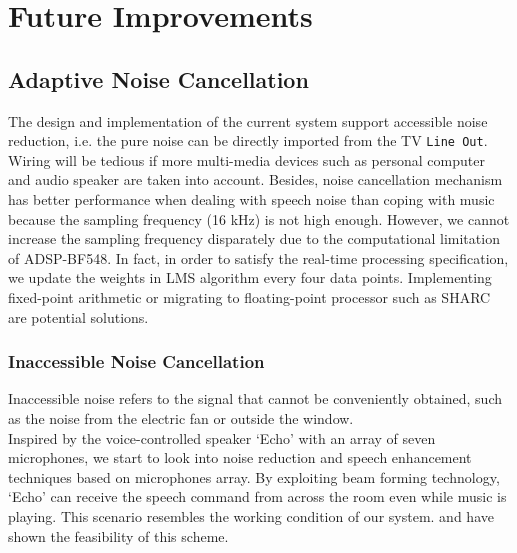 
\section{Future Improvements}

\subsection{Adaptive Noise Cancellation}

The design and implementation of the current system support accessible noise reduction, i.e. the pure noise can be directly imported from the TV \texttt{Line Out}. Wiring will be tedious if more multi-media devices such as personal computer and audio speaker are taken into account. Besides, noise cancellation mechanism has better performance when dealing with speech noise than coping with music because the sampling frequency (16 kHz) is not high enough. However, we cannot increase the sampling frequency disparately due to the computational limitation of ADSP-BF548. In fact, in order to satisfy the real-time processing specification, we update the weights in LMS algorithm every four data points. Implementing fixed-point arithmetic or migrating to floating-point processor such as SHARC\textsuperscript{\textregistered} are potential solutions.


\subsubsection{Inaccessible Noise Cancellation}

Inaccessible noise refers to the signal that cannot be conveniently obtained, such as the noise from the electric fan or outside the window.\\

Inspired by the voice-controlled speaker `Echo' with an array of seven microphones, we start to look into noise reduction and speech enhancement techniques based on microphones array. By exploiting beam forming technology, `Echo' can receive the speech command from across the room even while music is playing. This scenario resembles the working condition of our system. \cite{mccowan2003microphone} and \cite{spalt2011background} have shown the feasibility of this scheme.

